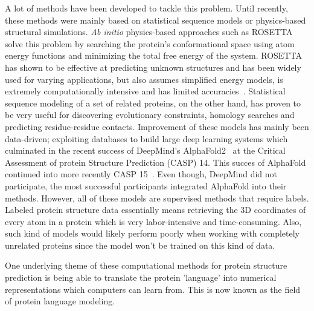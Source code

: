 A lot of methods have been developed to tackle this problem. Until recently, these methods were mainly based on statistical sequence models or physics-based structural simulations. \textit{Ab initio} physics-based approaches such as ROSETTA~\cite{rosetta} solve this problem by searching the protein's conformational space using atom energy functions and minimizing the total free energy of the system. ROSETTA has shown to be effective at predicting unknown structures and has been widely used for varying applications, but also assumes simplified energy models, is extremely computationally intensive and has limited accuracies~\cite{review}. Statistical sequence modeling of a set of related proteins, on the other hand, has proven to be very useful for discovering evolutionary constraints, homology searches and predicting residue-residue contacts. Improvement of these models has mainly been data-driven; exploiting databases to build large deep learning systems which culminated in the recent success of DeepMind's AlphaFold2~\cite{alphafold2} at the Critical Assessment of protein Structure Prediction (CASP) 14. This succes of AlphaFold continued into more recently CASP 15~\cite{casp15}. Even though, DeepMind did not participate, the most successful participants integrated AlphaFold into their methods. However, all of these models are supervised methods that require labels. Labeled protein structure data essentially means retrieving the 3D coordinates of every atom in a protein which is very labor-intensive and time-consuming. Also, such kind of models would likely perform poorly when working with completely unrelated proteins since the model won't be trained on this kind of data. 

One underlying theme of these computational methods for protein structure prediction is being able to translate the protein 'language' into numerical representations which computers can learn from. This is now known as the field of protein language modeling.

